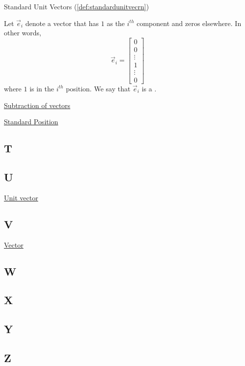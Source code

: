 \documentclass{ximera}
\begin{document}
Standard Unit Vectors (\ref{def:standardunitvecrn})
\begin{expandable}
  Let $\vec{e}_i$ denote a vector that has $1$ as the $i^{th}$ component and zeros elsewhere.  In other words, $$\vec{e}_i=\begin{bmatrix}
0\\
0\\
\vdots\\
1\\
\vdots\\
0
\end{bmatrix}$$ 
  where $1$ is in the $i^{th}$ position.  We say that  $\vec{e}_i$ is a .
\end{expandable}

\href{https://ximera.osu.edu/oerlinalg/LinearAlgebra/VEC-0030/main}{Subtraction of vectors}

\href{https://ximera.osu.edu/oerlinalg/LinearAlgebra/VEC-0010/main}{Standard Position}

\subsection{T}

\subsection{U}
\href{https://ximera.osu.edu/oerlinalg/LinearAlgebra/VEC-0036/main}{Unit vector}

\subsection{V}
\href{https://ximera.osu.edu/oerlinalg/LinearAlgebra/VEC-0010/main}{Vector}

\subsection{W}

\subsection{X}

\subsection{Y}

\subsection{Z}
\end{document}
